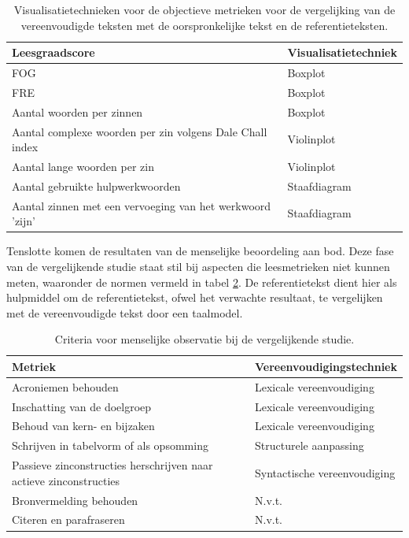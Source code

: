 \begin{center}
	\begin{table}[H]
		\begin{tabular}{ | m{8cm} | m{7cm} | } 
			\hline
			\textbf{Leesgraadscore} & \textbf{Visualisatietechniek }\\
			\hline
			FOG & Boxplot \\
			\hline
			FRE & Boxplot \\
			\hline
			Aantal woorden per zinnen & Boxplot \\
			\hline
			Aantal complexe woorden per zin volgens Dale Chall index & Violinplot \\
			\hline
			Aantal lange woorden per zin & Violinplot \\
			\hline
			Aantal gebruikte hulpwerkwoorden & Staafdiagram \\
			\hline
			Aantal zinnen met een vervoeging van het werkwoord 'zijn' & Staafdiagram \\
			\hline
		\end{tabular}
		\caption{Visualisatietechnieken voor de objectieve metrieken voor de vergelijking van de vereenvoudigde teksten met de oorspronkelijke tekst en de referentieteksten.}
		\label{table:verg-studie-metrieken}
	\end{table}
\end{center}

Tenslotte komen de resultaten van de menselijke beoordeling aan bod. Deze fase van de vergelijkende studie staat stil bij aspecten die leesmetrieken niet kunnen meten, waaronder de normen vermeld in tabel \ref{table:criteria-vergelijkende-studie-human-obv}. De referentietekst dient hier als hulpmiddel om de referentietekst, ofwel het verwachte resultaat, te vergelijken met de vereenvoudigde tekst door een taalmodel. 

\begin{table}[H]
	\begin{tabular}{| m{6cm} | m{6cm} |}
		\hline
		\textbf{Metriek} & \textbf{Vereenvoudigingstechniek} \\ \hline
		Acroniemen behouden & Lexicale vereenvoudiging 	\\ \hline
		Inschatting van de doelgroep & Lexicale vereenvoudiging	\\ \hline
		Behoud van kern- en bijzaken & Lexicale vereenvoudiging \\ \hline
		Schrijven in tabelvorm of als opsomming & Structurele aanpassing \\ \hline
		Passieve zinconstructies herschrijven naar actieve zinconstructies & Syntactische vereenvoudiging \\ \hline
		Bronvermelding behouden &  N.v.t. \\ \hline
		Citeren en parafraseren & N.v.t. \\ \hline
	\end{tabular}
	\caption{Criteria voor menselijke observatie bij de vergelijkende studie.}
	\label{table:criteria-vergelijkende-studie-human-obv}
\end{table}

